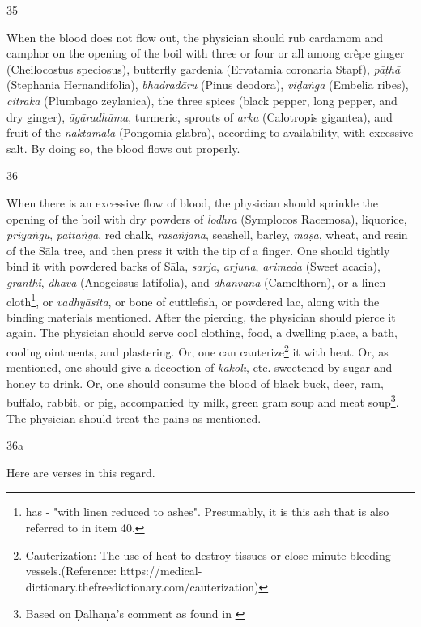 \begin{translation}
\item[35]

When the blood does not flow out, the physician should rub cardamom and camphor on the opening of the boil with three or four or all among crêpe ginger (Cheilocostus speciosus), butterfly gardenia (Ervatamia coronaria Stapf), \emph{pāṭhā} (Stephania Hernandifolia), \emph{bhadradāru} (Pinus deodora), \emph{viḍaṅga} (Embelia ribes), \emph{citraka} (Plumbago zeylanica), the three spices (black pepper, long pepper, and dry ginger), \emph{āgāradhūma}, turmeric, sprouts of \emph{arka} (Calotropis gigantea), and fruit of the \emph{naktamāla} (Pongomia glabra), according to availability, with excessive salt. By doing so, the blood flows out properly.

\item[36]

When there is an excessive flow of blood, the physician should sprinkle the opening of the boil with dry powders of \emph{lodhra} (Symplocos Racemosa), liquorice, \emph{priyaṅgu}, \emph{pattāṅga}, red chalk, \emph{rasāñjana}, seashell, barley, \emph{māṣa}, wheat, and resin of the Sāla tree, and then press it with the tip of a finger. 
One should tightly bind it with powdered barks of Sāla, \emph{sarja}, \emph{arjuna}, \emph{arimeda} (Sweet acacia), \emph{granthi}, \emph{dhava} (Anogeissus latifolia), and \emph{dhanvana} (Camelthorn), or a linen cloth\footnote{\cite[66]{vulgate} has  - "with linen reduced to ashes". Presumably, it is this ash that is also referred to in item 40.}, or \emph{vadhyāsita}, or bone of cuttlefish, or powdered lac, along with the binding materials mentioned. 
After the piercing, the physician should pierce it again. 
The physician should serve cool clothing, food, a dwelling place, a bath, cooling ointments, and plastering. Or, one can cauterize\footnote{Cauterization: The use of heat to destroy tissues or close minute bleeding vessels.(Reference: https://medical-dictionary.thefreedictionary.com/cauterization)} it with heat. Or, as mentioned, one should give a decoction of \emph{kākolī}, etc. sweetened by sugar and honey to drink. 
Or, one should consume the blood of black buck, deer, ram, buffalo, rabbit, or pig, accompanied by milk, green gram soup and meat soup\footnote{Based on Ḍalhaṇa's comment as found in \cite[66]{vulgate}}. 
The physician should treat the pains as mentioned. 

\item[36a]

Here are verses in this regard.


\end{translation}
